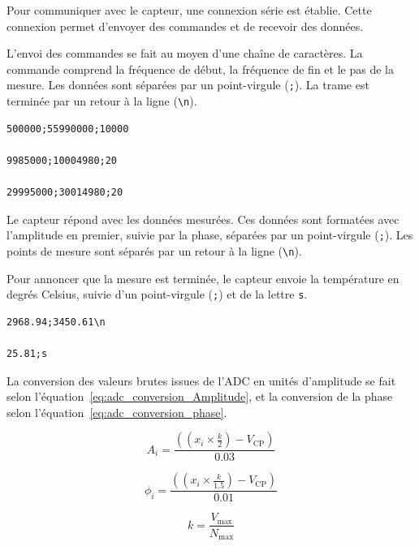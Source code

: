 Pour communiquer avec le capteur, une connexion série est établie. Cette connexion permet d'envoyer des commandes et de recevoir des données.

L’envoi des commandes se fait au moyen d’une chaîne de caractères. La commande comprend la fréquence de début, la fréquence de fin et le pas de la mesure. Les données sont séparées par un point-virgule (\texttt{;}). La trame est terminée par un retour à la ligne (\texttt{\textbackslash n}).

\begin{verbatim}
500000;55990000;10000

9985000;10004980;20

29995000;30014980;20
\end{verbatim}

Le capteur répond avec les données mesurées. Ces données sont formatées avec l'amplitude en premier, suivie par la phase, séparées par un point-virgule (\texttt{;}). Les points de mesure sont séparés par un retour à la ligne (\texttt{\textbackslash n}).

Pour annoncer que la mesure est terminée, le capteur envoie la température en degrés Celsius, suivie d’un point-virgule (\texttt{;}) et de la lettre \texttt{s}.

\begin{verbatim}
2968.94;3450.61\n

25.81;s
\end{verbatim}

La conversion des valeurs brutes issues de l'ADC en unités d'amplitude se fait selon l'équation~\ref{eq:adc_conversion_Amplitude}, et la conversion de la phase selon l'équation~\ref{eq:adc_conversion_phase}.

\begin{equation}
A_i = \frac{\left( \left( x_i \times \frac{k}{2} \right) - V_{\text{CP}} \right)}{0.03}
\label{eq:adc_conversion_Amplitude}
\end{equation}

\begin{equation}
\phi_i = \frac{\left( \left( x_i \times \frac{k}{1.5} \right) - V_{\text{CP}} \right)}{0.01}
\label{eq:adc_conversion_phase}
\end{equation}

\begin{equation}
k = \frac{V_{\text{max}}}{N_{\text{max}}}
\label{eq:adc_conversion}
\end{equation}

